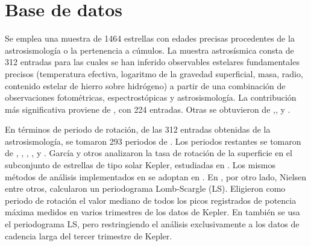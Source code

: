 \chapter{Base de datos}
\label{sec:data}

Se emplea una muestra de 1464 estrellas con edades precisas procedentes de la astrosismología o la pertenencia a cúmulos. La muestra astrosísmica consta de 312 entradas para las cuales se han inferido observables estelares fundamentales precisos (temperatura efectiva, logaritmo de la gravedad superficial, masa, radio, contenido estelar de hierro sobre hidrógeno) a partir de una combinación de observaciones fotométricas, espectrostópicas y astrosismología. La contribución más significativa proviene de \cite{Serenelli17}, con 224 entradas. Otras se obtuvieron de \cite{Ceillier16},\cite{Garcia14},\cite{Silva15} y \cite{Silva17}.

\begin{table}[H]
\centering
\centering
{}
\caption{Características proporcionadas en la muestra para cada estrella.}\label{table:data}
\end{table}

En términos de periodo de rotación, de las 312 entradas obtenidas de la astrosismología, se tomaron 293 periodos de \cite{Garcia14}. Los periodos restantes se tomaron de \cite{Ceillier16}, \cite{Mazeh15}, \cite{McQuillan13a}, \cite{McQuillan14}, \cite{Nielsen13} y \cite{Reinhold13}. García y otros \cite{Garcia14} analizaron la tasa de rotación de la superficie en el subconjunto de estrellas de tipo solar Kepler, estudiadas en \cite{Garcia14}. Los mismos métodos de análisis implementados en \cite{Garcia14} se adoptan en \cite{Ceillier16}. En \cite{Nielsen13}, por otro lado, Nielsen entre otros, calcularon un periodograma Lomb-Scargle (LS). Eligieron como periodo de rotación el valor mediano de todos los picos registrados de potencia máxima medidos en varios trimestres de los datos de Kepler. En \cite{Reinhold13} también se usa el periodograma LS, pero restringiendo el análisis exclusivamente a los datos de cadencia larga del tercer trimestre de Kepler.

